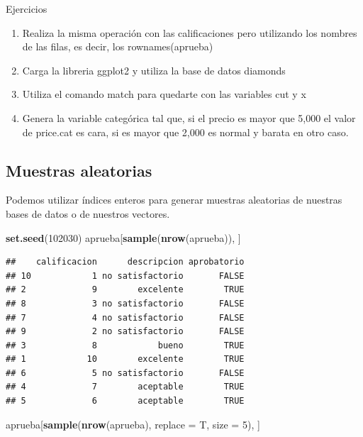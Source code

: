 \documentclass[]{article}
\newenvironment{Shaded}{\begin{snugshade}}{\end{snugshade}}
\newcommand{\KeywordTok}[1]{\textcolor[rgb]{0.13,0.29,0.53}{\textbf{{#1}}}}
\newcommand{\DataTypeTok}[1]{\textcolor[rgb]{0.13,0.29,0.53}{{#1}}}
\newcommand{\DecValTok}[1]{\textcolor[rgb]{0.00,0.00,0.81}{{#1}}}
\newcommand{\NormalTok}[1]{{#1}}
\begin{document}
\renewcommand\bcStyleTitre[1]{\large\textcolor{bbblack}{#1}}

\begin{bclogo}[
  couleur=llred,
  arrondi=0,
  logo=\bcstop,
  barre=none,
  noborder=true]{Ejercicios}
\begin{enumerate}
\item Realiza la misma operación con las calificaciones pero utilizando los 
nombres de las filas, es decir, los rownames(aprueba)
\item Carga la libreria ggplot2 y utiliza la base de datos diamonds
\item Utiliza el comando match para quedarte con las variables cut y x 
\item Genera la variable categórica tal que, si el precio es mayor que 5,000 el 
valor de price.cat es cara, si es mayor que 2,000 es normal y barata en otro caso.
\end{enumerate}
\end{bclogo}

\subsection{Muestras aleatorias}\label{muestras-aleatorias}

Podemos utilizar índices enteros para generar muestras aleatorias de
nuestras bases de datos o de nuestros vectores.

\begin{Shaded}
\begin{Highlighting}[]
\KeywordTok{set.seed}\NormalTok{(}\DecValTok{102030}\NormalTok{)}
\NormalTok{aprueba[}\KeywordTok{sample}\NormalTok{(}\KeywordTok{nrow}\NormalTok{(aprueba)), ]}
\end{Highlighting}
\end{Shaded}

\begin{verbatim}
##    calificacion      descripcion aprobatorio
## 10            1 no satisfactorio       FALSE
## 2             9        excelente        TRUE
## 8             3 no satisfactorio       FALSE
## 7             4 no satisfactorio       FALSE
## 9             2 no satisfactorio       FALSE
## 3             8            bueno        TRUE
## 1            10        excelente        TRUE
## 6             5 no satisfactorio       FALSE
## 4             7        aceptable        TRUE
## 5             6        aceptable        TRUE
\end{verbatim}

\begin{Shaded}
\begin{Highlighting}[]
\NormalTok{aprueba[}\KeywordTok{sample}\NormalTok{(}\KeywordTok{nrow}\NormalTok{(aprueba), }\DataTypeTok{replace =} \NormalTok{T, }\DataTypeTok{size =} \DecValTok{5}\NormalTok{), ]}
\end{Highlighting}
\end{Shaded}
\end{document}
